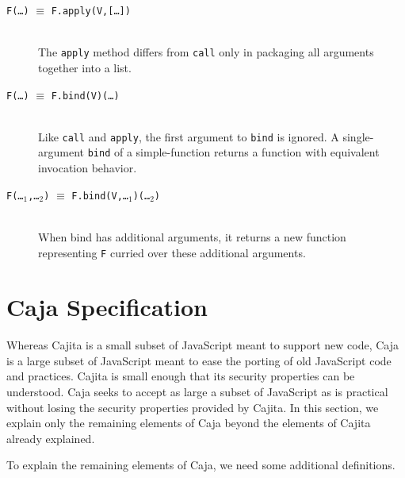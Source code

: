 \documentclass[letterpaper,twocolumn,10pt]{article}
\newcommand{\code}[1]{{\tt {#1}}}              %
\begin{document}
\begin{description}
  \item[\code{F(\ldots)} $\equiv$ \code{F.apply(V,[\ldots])}]
  
  \ \\
  The \code{apply} method differs from \code{call} only in packaging all 
  arguments together into a list.
  
  \item[\code{F(\ldots)} $\equiv$ \code{F.bind(V)(\ldots)}]
  
  \ \\
  Like \code{call} and \code{apply}, the first argument to \code{bind} is 
  ignored. A single-argument \code{bind} of a simple-function returns a 
  function with equivalent invocation behavior.
  
  \item[\code{F(\ldots$_1$,\ldots$_2$)} $\equiv$ 
  \code{F.bind(V,\ldots$_1$)(\ldots$_2$)}]

  \ \\
  When bind has additional arguments, it returns a new function representing 
  \code{F} curried over these additional arguments.
  
\end{description}


\section{Caja Specification}
\label{sec:caja-spec}

Whereas Cajita is a small subset of JavaScript meant to support new code, 
Caja is a large subset of JavaScript meant to ease the porting of old 
JavaScript code and practices. Cajita is small enough that its security 
properties can be understood. Caja seeks to accept as large a subset of 
JavaScript as is practical without losing the security properties provided by 
Cajita. In this section, we explain only the remaining elements of Caja 
beyond the elements of Cajita already explained.

To explain the remaining elements of Caja, we need some additional 
definitions.
\end{document}
